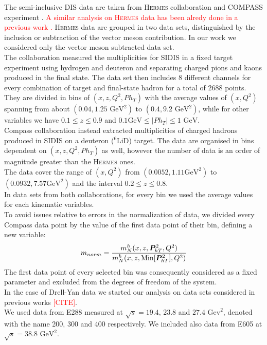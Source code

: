 \documentclass[aps,preprintnumbers,showpacs,nofootinbib,superscriptaddress,floatfix]{revtex4}
\newcommand{\Tperp}{T}
\begin{document}
The semi-inclusive DIS data are taken from \textsc{Hermes} collaboration \cite{Airapetian:2012ki} and COMPASS experiment \cite{Adolph:2013stb}.
\textcolor{red}{A similar analysis on \textsc{Hermes} data has been alredy done in a previous work \cite{Signori:2013mda}.}  \textsc{Hermes} data are grouped in two data sets, distinguished by the inclusion or subtraction of the vector meson contribution. In our work we considered only the vector meson subtracted data set.\\
The collaboration measured the multiplicities for SIDIS in a fixed target experiment using hydrogen and deuteron and separating charged pions and kaons produced in the final state. The data set then includes 8 different channels for every combination of target and final-state hadron for a total of 2688 points.\\
They are divided in bins of $(x,z,Q^2,Ph_T)$ with the average values of $(x,Q^2)$ spanning from about $(0.04, 1.25\text{ GeV}^2)$ to $(0.4, 9.2\text{ GeV}^2)$, while for other variables we have $0.1\leq z\leq 0.9$ and $0.1 \text{GeV} \leq \vert Ph_T \vert \leq 1 \text{ GeV}$.\\

Compass collaboration instead extracted multiplicities of charged hadrons produced in SIDIS on a deuteron ($^6\text{LiD}$) target. The data are organised in bins dependent on $(x,z,Q^2,Ph_T)$ as well, however the number of data is an order of magnitude greater than the \textsc{Hermes} ones.\\
The data cover the range of $(x,Q^2)$ from $(0.0052, 1.11\text{GeV}^2)$ to $(0.0932, 7.57\text{GeV}^2)$ and the interval $0.2 \leq z \leq 0.8$.\\
In data sets from both collaborations, for every bin we used the average values for each kinematic variables.\\

To avoid issues relative to errors in the normalization of data, we divided every Compass data point by the value of the first data point of their bin, defining a new variable:
\begin{equation}
m_{norm} = \frac{m_N^h(x,z,\bm{P}_{h\Tperp}^2, Q^2)}{m_N^h (x,z,{\rm Min}[\bm{P}_{h\Tperp}^2], Q^2)}
\label{eq:mult_norm}
\end{equation}
The first data point of every selected bin  was consequently considered as a fixed parameter and excluded from the degrees of freedom of the system.\\

In the case of Drell-Yan data we started our analysis on data sets considered in previous works \textcolor{red}{[CITE]}.\\
We used data from E288\cite{Ito:1980ev} measured at $\sqrt{s}=19.4,\,23.8$ and $27.4\text{ Gev}^2$, denoted with the name 200, 300 and 400 respectively. We included also data from E605 \cite{Moreno:1990sf} at $\sqrt{s}=38.8 \text{ GeV}^2$.
\end{document}

